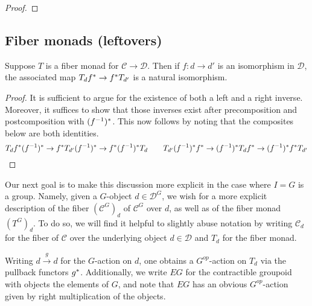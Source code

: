 \documentclass[a4paper,10pt
,draft
]{article}%
\renewcommand{\1}{\eta}%
\begin{document}
\begin{proof}

\end{proof}




\subsection{Fiber monads (leftovers)}






\begin{lemma}
Suppose $T$ is a fiber monad for 
$\mathcal{C} \to \mathcal{D}$.
Then if $f\colon d \to d'$ is an isomorphism in $\mathcal{D}$,
the associated map
$T_d f^{\**} \to f^{\**}T_{d'}$
is a natural isomorphism.
\end{lemma}

\begin{proof}
It is sufficient to argue for the existence of both a left and a right inverse. Moreover, it suffices to show that those inverses exist after precomposition and postcomposition with $(f^{-1})^{\**}$. This now follows by noting that the composites below are both identities.
\[T_d f^{\**}(f^{-1})^{\**} \to 
f^{\**} T_{d'} (f^{-1})^{\**} \to
f^{\**}(f^{-1})^{\**} T_d
\qquad 
T_{d'} (f^{-1})^{\**}f^{\**} \to 
(f^{-1})^{\**} T_{d} f^{\**} \to
(f^{-1})^{\**} f^{\**}T_{d'}
\]
\end{proof}






Our next goal is to make this discussion more explicit in the case where
$I=G$ is a group.
Namely, given a $G$-object $d \in \mathcal{D}^G$,
we wish for a more explicit description of the fiber
$\left(\mathcal{C}^G\right)_d$ of $\mathcal{C}^G$ over $d$,
as well as of the fiber monad $(T^G)_d$.
To do so, we will find it helpful to slightly abuse notation by writing $\mathcal{C}_d$ for the fiber of $\mathcal{C}$ over the underlying object $d \in \mathcal{D}$ and $T_d$ for the fiber monad.

Writing $d\xrightarrow{g} d$ for the $G$-action on $d$, one obtains a  $G^{op}$-action on $T_d$ via the pullback functors $g^{\**}$.
Additionally, we write $EG$ for the contractible groupoid with objects the elements of $G$, and note that $EG$ has an obvious 
$G^{op}$-action given by right multiplication of the objects.
\end{document}
